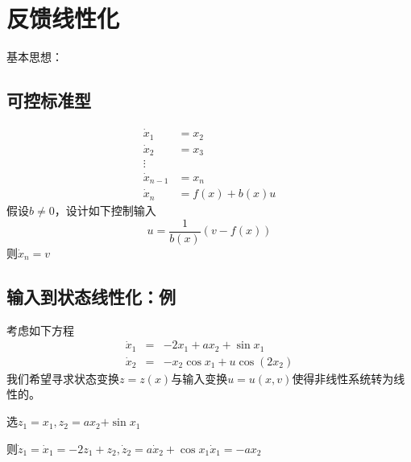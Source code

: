 \section{反馈线性化}\label{5Bref}

基本思想：

\subsection{可控标准型}

\begin{align*}
    \dot{x}_1 & =  x_2\\
     \dot{x}_2 & =  x_3\\
     \vdots &   \\
     \dot{x}_{n - 1} & = x_n\\
    \dot{x}_n & = f (x) + b (x) u
\end{align*}
假设$b \neq 0$，设计如下控制输入
\[ u = \frac{1}{b (x)} (v - f (x)) \]
则$\dot{x}_n = v$

\subsection{输入到状态线性化：例}

\begin{example}
  考虑如下方程
  \[ \begin{array}{ccc}
       \dot{x}_1 & = & - 2 x_1 + a x_2 + \sin x_1\\
       \dot{x}_2 & = & - x_2 \cos x_1 + u \cos (2 x_2)
     \end{array} \]
  我们希望寻求状态变换$z = z (x)$与输入变换$u = u (x, v)$使得非线性系统转为线性的。
  
  选$z_1 = x_1, z_2 = a x_2 {+ \sin x_1} $
  
  则$\dot{z}_1 = \dot{x}_1 = - 2 z_1 + z_2, \dot{z}_2 = a \dot{x}_2 + \cos
  x_1 \dot{x}_1 = - a x_2$
\end{example}

